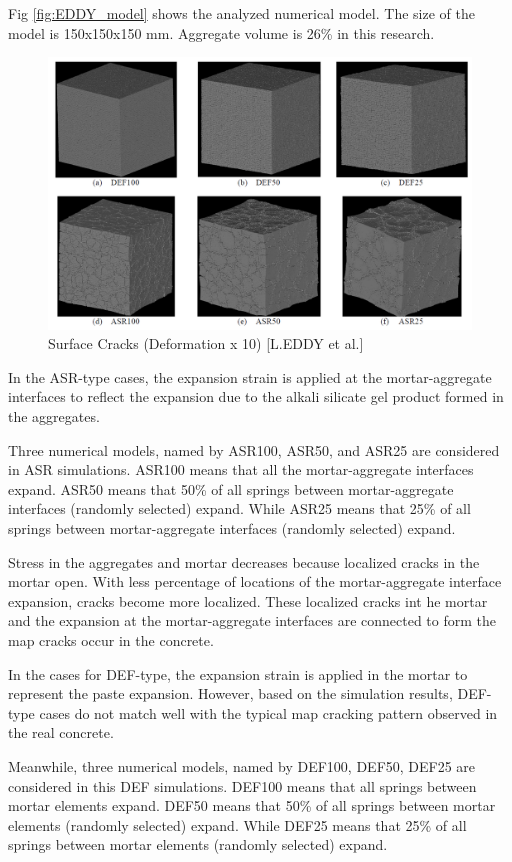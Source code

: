 \begin{itemize}
    Fig \ref{fig:EDDY_model} shows the analyzed numerical model. The size of the model is 150x150x150 mm. Aggregate volume is 26\% in this research.

    \begin{figure}[ht!]
        \centering
        \includegraphics[width=.9\linewidth]{Files/Background/EDDY.png}
        \caption{Surface Cracks (Deformation x 10) [L.EDDY et al.]}
        \label{fig:EDDY}
    \end{figure}

    In the ASR-type cases, the expansion strain is applied at the mortar-aggregate interfaces to reflect the expansion due to the alkali silicate gel product formed in the aggregates.

    Three numerical models, named by ASR100, ASR50, and ASR25 are considered in ASR simulations. ASR100 means that all the mortar-aggregate interfaces expand. ASR50 means that 50\% of all springs between mortar-aggregate interfaces (randomly selected) expand. While ASR25 means that 25\% of all springs between mortar-aggregate interfaces (randomly selected) expand.

    Stress in the aggregates and mortar decreases because localized cracks in the mortar open. With less percentage of locations of the mortar-aggregate interface expansion, cracks become more localized. These localized cracks int he mortar and the expansion at the mortar-aggregate interfaces are connected to form the map cracks occur in the concrete.

    In the cases for DEF-type, the expansion strain is applied in the mortar to represent the paste expansion. However, based on the simulation results, DEF-type cases do not match well with the typical map cracking pattern observed in the real concrete.

    Meanwhile, three numerical models, named by DEF100, DEF50, DEF25 are considered in this DEF simulations. DEF100 means that all springs between mortar elements expand. DEF50 means that 50\% of all springs between mortar elements (randomly selected) expand. While DEF25 means that 25\% of all springs between mortar elements (randomly selected) expand.


\end{itemize}
